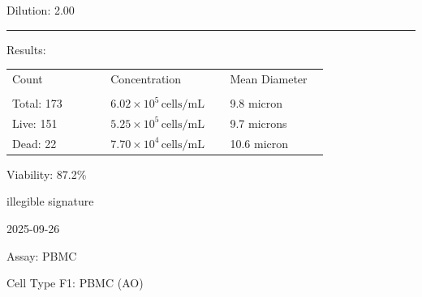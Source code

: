 \documentclass[UTF8,10pt,a4paper,fontset=fandol]{ctexart}
\newcommand{\fieldvalue}[1]{#1}
\newcommand{\handwritten}[1]{#1}
\begin{document}
Dilution: 
\fieldvalue{2.00}

\medskip
\hrule
\medskip

Results:

\medskip

\begin{tabular}{@{}p{0.28\linewidth}p{0.34\linewidth}p{0.28\linewidth}@{}}
Count & Concentration & Mean Diameter \\
\underline{\hspace{0.28\linewidth}} &
\underline{\hspace{0.34\linewidth}} &
\underline{\hspace{0.28\linewidth}} \\[2pt]
Total: 
\fieldvalue{173}
&
\fieldvalue{$6.02 \times 10^{5}\,\mathrm{cells/mL}$}
&
\fieldvalue{9.8 micron}
\\
Live: 
\fieldvalue{151}
&
\fieldvalue{$5.25 \times 10^{5}\,\mathrm{cells/mL}$}
&
\fieldvalue{9.7 microns}
\\
Dead: 
\fieldvalue{22}
&
\fieldvalue{$7.70 \times 10^{4}\,\mathrm{cells/mL}$}
&
\fieldvalue{10.6 micron}
\end{tabular}

\medskip

Viability: 
\fieldvalue{87.2\%}

\vfill

\handwritten{illegible signature}

\medskip

\handwritten{2025-09-26}

\newpage

Assay: 
\fieldvalue{PBMC}

Cell Type F1: 
\fieldvalue{PBMC (AO)}
\end{document}
